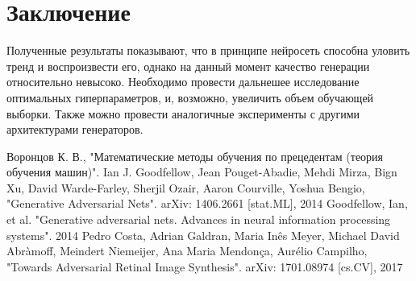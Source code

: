\documentclass[a4paper]{article}
\begin{document}
	\section{Заключение}
		Полученные результаты показывают, что в принципе нейросеть способна уловить тренд и воспроизвести его, однако на данный момент качество генерации относительно невысоко. Необходимо провести дальнешее исследование оптимальных гиперпараметров, и, возможно, увеличить объем обучающей выборки. Также можно провести аналогичные эксперименты с другими архитектурами генераторов.
	\begin{thebibliography}{99}
		  Воронцов К. В., "Математические методы обучения по прецедентам (теория обучения машин)".
		 Ian J. Goodfellow, Jean Pouget-Abadie, Mehdi Mirza, Bign Xu, David Warde-Farley, Sherjil Ozair, Aaron Courville, Yoshua Bengio, "Generative Adversarial Nets". arXiv: 1406.2661 [stat.ML], 2014
		 Goodfellow, Ian, et al. "Generative adversarial nets. Advances in neural information processing systems". 2014
		 Pedro Costa, Adrian Galdran, Maria Inês Meyer, Michael David Abràmoff, Meindert Niemeijer, Ana Maria Mendonça, Aurélio Campilho, "Towards Adversarial Retinal Image Synthesis". arXiv: 1701.08974 [cs.CV], 2017
	
\end{thebibliography}
\end{document}
